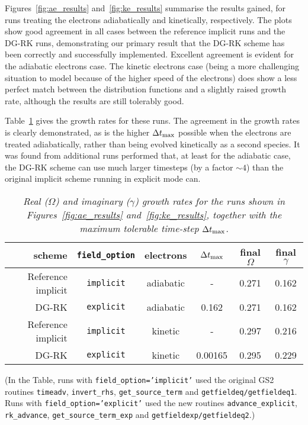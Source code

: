 \documentclass[10pt,a4paper]{article}
\begin{document}
Figures~\ref{fig:ae_results} and~\ref{fig:ke_results} summarise the results
gained, for runs treating the electrons adiabatically and kinetically,
respectively. The plots show good agreement in all cases between the reference
implicit runs and the DG-RK runs, demonstrating our primary result that the
DG-RK scheme has been correctly and successfully implemented. Excellent
agreement is evident for the adiabatic electrons case. The kinetic
electrons case (being a more challenging situation to model because of the
higher speed of the electrons) does show a less perfect match between the
distribution functions and a slightly raised growth rate, although the results
are still tolerably good.

Table~\ref{tab:growthrates} gives the growth rates for these runs. The
agreement in the growth rates is clearly demonstrated, as is the higher
$\Delta t_{\mbox{\scriptsize max}}$ possible when the electrons are treated
adiabatically, rather than being evolved kinetically as a second species. It
was found from additional runs performed that, at least for the adiabatic
case, the DG-RK scheme can use much larger timesteps (by a factor $\sim 4$)
than the original implicit scheme running in explicit mode can.

\begin{table}[!p]
\begin{center}
\begin{tabular}{|r|c|c|c|c|c|} \hline
scheme & \texttt{field\_option} & electrons & $\Delta t_{\mbox{\scriptsize max}}$ &
final $\Omega$ & final $\gamma$ \\ \hline
Reference implicit & \texttt{implicit} & adiabatic & - & 0.271 & 0.162 \\
DG-RK & \texttt{explicit} & adiabatic & 0.162 & 0.271 & 0.162 \\ \hline
Reference implicit & \texttt{implicit} & kinetic & - & 0.297 & 0.216 \\
DG-RK & \texttt{explicit} & kinetic & 0.00165 & 0.295 & 0.229 \\ \hline
\end{tabular}
\end{center}
\caption{\textit{Real ($\Omega$) and imaginary ($\gamma$) growth rates for the
    runs shown in Figures~\ref{fig:ae_results} and~\ref{fig:ke_results},
    together with the maximum tolerable time-step $\Delta t_{\mbox{\scriptsize max}}$.}
  \label{tab:growthrates} }
\end{table}

(In the Table, runs with \texttt{field\_option='implicit'} used the original
GS2 routines \texttt{timeadv}, \texttt{invert\_rhs},
\texttt{get\_source\_term} and \texttt{getfieldeq/getfieldeq1}. Runs with
\texttt{field\_option='explicit'} used the new routines
\texttt{advance\_explicit}, \texttt{rk\_advance},
\texttt{get\_source\_term\_exp} and \texttt{getfieldexp/getfieldeq2}.)
\end{document}
